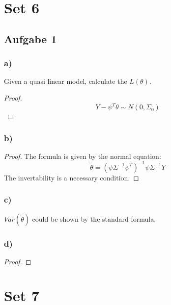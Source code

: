 \documentclass[a4paper,11pt]{article}
\theoremstyle{definition}
\theoremstyle{remark}
\begin{document}

\section*{Set 6}

\subsection*{Aufgabe 1}
\subsubsection*{a)}
Given a quasi linear model, calculate the $L(\theta)$.
\begin{proof}
	\begin{equation*}
		Y - \psi^T \theta \sim N(0, \Sigma_0)
	\end{equation*}
\end{proof}


\subsubsection*{b)}
\begin{proof}
	The formula is given by the normal equation:
	\begin{equation*}
		\tilde{\theta} = (\psi \Sigma^{-1} \psi^T)^{-1} \psi \Sigma^{-1} Y
	\end{equation*}
	The invertability is a necessary condition. 
\end{proof}

\subsubsection*{c)}
$Var(\tilde{\theta})$ could be shown by the standard formula.

\subsubsection*{d)}
\begin{proof}
	
\end{proof}







\section*{Set 7}
\end{document}
